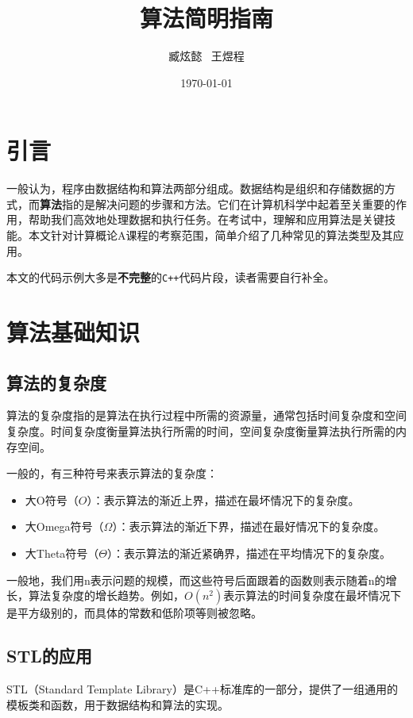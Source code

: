 \documentclass{article}
\title{{\Huge\textbf{算法简明指南}}}
\author{臧炫懿 \ 王煜程}
\date{\today}
\begin{document}
\maketitle
\tableofcontents

\newpage

\section{引言}

一般认为，程序由数据结构和算法两部分组成。数据结构是组织和存储数据的方式，而\textbf{算法}指的是解决问题的步骤和方法。它们在计算机科学中起着至关重要的作用，帮助我们高效地处理数据和执行任务。在考试中，理解和应用算法是关键技能。本文针对计算概论A课程的考察范围，简单介绍了几种常见的算法类型及其应用。

本文的代码示例大多是\textbf{不完整}的\texttt{C++}代码片段，读者需要自行补全。

\section{算法基础知识}

\subsection{算法的复杂度}

算法的复杂度指的是算法在执行过程中所需的资源量，通常包括时间复杂度和空间复杂度。时间复杂度衡量算法执行所需的时间，空间复杂度衡量算法执行所需的内存空间。

一般的，有三种符号来表示算法的复杂度：
\begin{itemize}
  \item 大O符号（$O$）：表示算法的渐近上界，描述在最坏情况下的复杂度。
  \item 大Omega符号（$\Omega$）：表示算法的渐近下界，描述在最好情况下的复杂度。
  \item 大Theta符号（$\Theta$）：表示算法的渐近紧确界，描述在平均情况下的复杂度。
\end{itemize}
一般地，我们用n表示问题的规模，而这些符号后面跟着的函数则表示随着n的增长，算法复杂度的增长趋势。例如，$O(n^2)$表示算法的时间复杂度在最坏情况下是平方级别的，而具体的常数和低阶项等则被忽略。

\subsection{STL的应用}

STL（Standard Template Library）是C++标准库的一部分，提供了一组通用的模板类和函数，用于数据结构和算法的实现。
\end{document}
